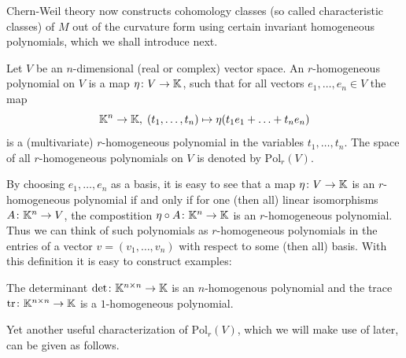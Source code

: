 Chern-Weil theory now constructs cohomology classes (so called characteristic classes) of $M$ out of the curvature form using certain invariant homogeneous polynomials, which we shall introduce next.

\begin{definition}
    Let $V$ be an $n$-dimensional (real or complex) vector space. An $r$-homogeneous polynomial on $V$ is a map $\eta \colon V \to \mathbb{K}$, such that for all vectors $e_1,\ldots,e_n \in V$ the map 
    \[
    \mathbb{K}^n \to \mathbb{K}, \; (t_1,\ldots,t_n) \mapsto \eta(t_1e_1 + \ldots + t_n e_n)
    \]
    is a (multivariate) $r$-homogeneous polynomial in the variables $t_1,\ldots,t_n$. The space of all $r$-homogeneous polynomials on $V$ is denoted by $\mathrm{Pol}_r(V)$.
\end{definition}

By choosing $e_1,\ldots,e_n$ as a basis, it is easy to see that a map $\eta \colon V \to \mathbb{K}$ is an $r$-homogeneous polynomial if and only if for one (then all) linear isomorphisms $A \colon \mathbb{K}^n \to V$, the compostition $\eta \circ A \colon \mathbb{K}^n \to \mathbb{K}$ is an $r$-homogeneous polynomial. Thus we can think of such polynomials as $r$-homogeneous polynomials in the entries of a vector $v = (v_1,\ldots,v_n)$ with respect to some (then all) basis. With this definition it is easy to construct examples:

\begin{example}
    The determinant $\mathrm{det} \colon \mathbb{K}^{n\times n} \to \mathbb{K}$ is an $n$-homogenous polynomial and the trace $\mathrm{tr} \colon \mathbb{K}^{n\times n} \to \mathbb{K}$ is a $1$-homogeneous polynomial.
\end{example}

Yet another useful characterization of $\mathrm{Pol}_r(V)$, which we will make use of later, can be given as follows. 

